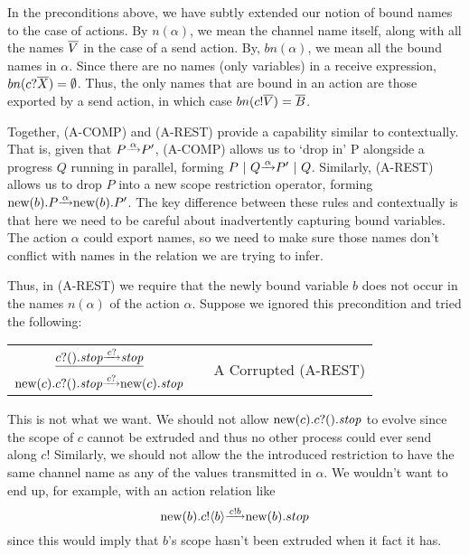 In the preconditions above, we have subtly extended our notion of bound names to the case of actions.  
By $n(\alpha)$, we mean the channel name itself, along with all the names $\overline{V}$ in the case of a send action.  
By, $bn(\alpha)$, we mean all the bound names in $\alpha$.  
Since there are no names (only variables) in a receive expression, $bn({c}?{\overline{X}}) = \emptyset$.  
Thus, the only names that are bound in an action are those exported by a send action, in which case $bn({c}!{\overline{V}}) = \overline{B}$.

Together, (A-COMP) and (A-REST) provide a capability similar to contextually.  
That is, given that $P \overset{\underrightarrow{\ {\alpha}\ }}{} P'$, (A-COMP) allows us to `drop in' P alongside a progress $Q$ running in parallel, forming $P\ |\  Q \overset{\underrightarrow{\ {\alpha}\ }}{} P' \ |\  Q$.
Similarly, (A-REST) allows us to drop $P$ into a new scope restriction operator, forming $\text{new}({b}).P \overset{\underrightarrow{\ {\alpha}\ }}{} \text{new}({b}).P'$.
The key difference between these rules and contextually is that here we need to be careful about inadvertently capturing bound variables.
The action $\alpha$ could export names, so we need to make sure those names don't conflict with names in the relation we are trying to infer.

Thus, in (A-REST) we require that the newly bound variable $b$ does not occur in the names $n(\alpha)$ of the action $\alpha$.  
Suppose we ignored this precondition and tried the following:
\begin{center}\begin{tabular}{rllll}
	\multicolumn{3}{c}{$\underline{{c}?({}).\mbox{\emph{stop}} \overset{\underrightarrow{\ { \ensuremath{{c}?{}} }\ }}{} \mbox{\emph{stop}}}$} & & \multirow{2}{*}{\tiny{A Corrupted (A-REST)}}\\
	\multicolumn{3}{c}{$\text{new}({c}). {c}?({}).\mbox{\emph{stop}} \overset{\underrightarrow{\ { \ensuremath{{c}?{}} }\ }}{} \text{new}({c}). \mbox{\emph{stop}}$}\\[10pt]
\end{tabular}\end{center}
This is not what we want.  
We should not allow $\text{new}({c}). {c}?({}).\mbox{\emph{stop}}$ to evolve since the scope of $c$ cannot be extruded and thus no other process could ever send along $c$!  
Similarly, we should not allow the the introduced restriction to have the same channel name as any of the values transmitted in $\alpha$.  
We wouldn't want to end up, for example, with an action relation like 
\[
	\text{new}({b}). {c}!\langle{b}\rangle \overset{\underrightarrow{\ { \ensuremath{{c}!{b}} }\ }}{} \text{new}({b}). stop
\]
since this would imply that $b$'s scope hasn't been extruded when it fact it has.


